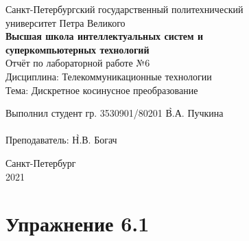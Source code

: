 \documentclass[a4paper, 14pt]{extarticle}
\begin{document}
    \begin{center}
        \begin{center}
            \hfill \break
            \normalsize{Санкт-Петербургский государственный политехнический}\\
            \normalsize{университет Петра Великого}\\
            \hfill \break
            \normalsize{\textbf{Высшая школа интеллектуальных систем и}}\\
            \normalsize{\textbf{суперкомпьютерных технологий}}\\
            \hfill \break
            \hfill \break
            \hfill \break
            \hfill \break
            \hfill \break
            \normalsize{Отчёт по лабораторной работе №6}\\
            \normalsize{Дисциплина: Телекоммуникационные технологии}\\
            \normalsize{Тема: Дискретное косинусное преобразование}\\
        \end{center}
        \hfill \break
        \hfill \break
        \hfill \break
        \hfill \break
        \hfill \break
        \hfill \break
        \hfill \break
        \hfill \break
        \hfill \break
        \hfill \break
        \begin{tabbing}
            Выполнил студент гр. 3530901/80201 \`В.А. Пучкина\\
            \\
            Преподаватель: \`Н.В. Богач\\
        \end{tabbing}
        \hfill \break
        \hfill \break
        \hfill \break
        \hfill \break
        \begin{center}
            Санкт-Петербург\\
            2021
        \end{center}
        \thispagestyle{empty}
    \end{center}

    \newpage
    \tableofcontents

    \newpage
    \listoffigures

    \newpage
    \lstlistoflistings

    \newpage
    \section{Упражнение 6.1}
    \label{sec:task1}
\end{document}
